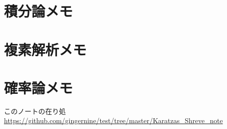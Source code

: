 \documentclass[a4j,10.5pt,oneside,openany]{jsbook}
\theoremstyle{mystyle}
\begin{document}
\chapter{積分論メモ}
	
	
	
	
	
	
	
	
	

\chapter{複素解析メモ}
	
	
	
	
%

\chapter{確率論メモ}
	
	
	
	
	
	
	
	
	
	
	
	
	

%	

\newpage
\printindex


このノートの在り処
\url{https://github.com/gingernine/test/tree/master/Karatzas_Shreve_note}
%
%
\end{document}
